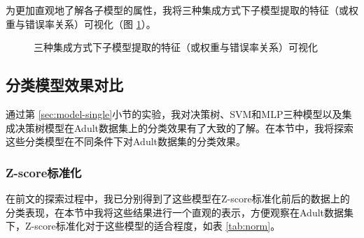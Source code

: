 \documentclass[12pt,a4paper]{article}
\theoremstyle{definition}
\begin{document}
\vspace{0.01\linewidth}
为更加直观地了解各子模型的属性，我将三种集成方式下子模型提取的特征（或权重与错误率关系）可视化（图 \ref{fig:model-plus2}）。

\begin{figure}[H]
	\centering
	\caption{三种集成方式下子模型提取的特征（或权重与错误率关系）可视化}
	\label{fig:model-plus2}
\end{figure}

\subsection{分类模型效果对比}
\label{sec:compare}

通过第 \ref{sec:model-single}小节的实验，我对决策树、SVM和MLP三种模型以及集成决策树模型在Adult数据集上的分类效果有了大致的了解。在本节中，我将探索这些分类模型在不同条件下对Adult数据集的分类效果。

\subsubsection{Z-score标准化}

在前文的探索过程中，我已分别得到了这些模型在Z-score标准化前后的数据上的分类表现，在本节中我将这些结果进行一个直观的表示，方便观察在Adult数据集下，Z-score标准化对于这些模型的适合程度，如表 \ref{tab:norm}。
\end{document}
